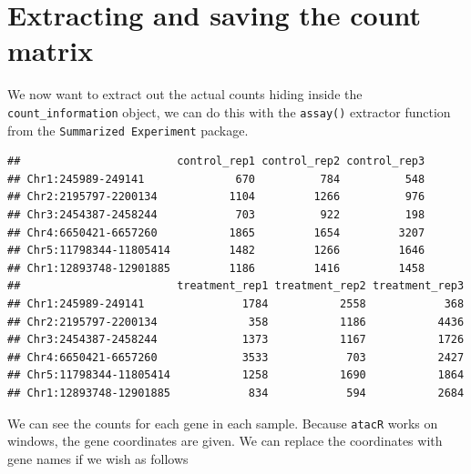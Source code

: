 \documentclass[]{book}
\newenvironment{Shaded}{\begin{snugshade}}{\end{snugshade}}
\newcommand{\DataTypeTok}[1]{\textcolor[rgb]{0.13,0.29,0.53}{#1}}
\newcommand{\KeywordTok}[1]{\textcolor[rgb]{0.13,0.29,0.53}{\textbf{#1}}}
\newcommand{\NormalTok}[1]{#1}
\newcommand{\OperatorTok}[1]{\textcolor[rgb]{0.81,0.36,0.00}{\textbf{#1}}}
\newcommand{\OtherTok}[1]{\textcolor[rgb]{0.56,0.35,0.01}{#1}}
\newcommand{\StringTok}[1]{\textcolor[rgb]{0.31,0.60,0.02}{#1}}
\begin{document}
\hypertarget{extracting-and-saving-the-count-matrix}{%
\section{Extracting and saving the count matrix}\label{extracting-and-saving-the-count-matrix}}

We now want to extract out the actual counts hiding inside the \texttt{count\_information} object, we can do this with the \texttt{assay()} extractor function from the \texttt{Summarized\ Experiment} package.

\begin{Shaded}
\end{Shaded}

\begin{verbatim}
##                        control_rep1 control_rep2 control_rep3
## Chr1:245989-249141              670          784          548
## Chr2:2195797-2200134           1104         1266          976
## Chr3:2454387-2458244            703          922          198
## Chr4:6650421-6657260           1865         1654         3207
## Chr5:11798344-11805414         1482         1266         1646
## Chr1:12893748-12901885         1186         1416         1458
##                        treatment_rep1 treatment_rep2 treatment_rep3
## Chr1:245989-249141               1784           2558            368
## Chr2:2195797-2200134              358           1186           4436
## Chr3:2454387-2458244             1373           1167           1726
## Chr4:6650421-6657260             3533            703           2427
## Chr5:11798344-11805414           1258           1690           1864
## Chr1:12893748-12901885            834            594           2684
\end{verbatim}

We can see the counts for each gene in each sample. Because \texttt{atacR} works on windows, the gene coordinates are given. We can replace the coordinates with gene names if we wish as follows

\begin{Shaded}
\end{Shaded}
\end{document}
